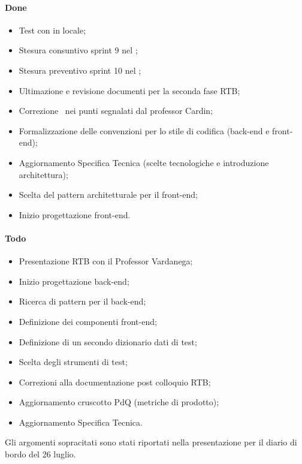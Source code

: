 \paragraph{Done}
\begin{itemize}
	\item Test con  in locale;
	\item Stesura consuntivo sprint 9 nel \PdP;
	\item Stesura preventivo sprint 10 nel \PdP;
	\item Ultimazione e revisione documenti per la seconda fase RTB;
	\item Correzione \AdR\ nei punti segnalati dal professor Cardin;
	\item Formalizzazione delle convenzioni per lo stile di codifica (back-end e front-end);
	\item Aggiornamento Specifica Tecnica (scelte tecnologiche e introduzione architettura);
	\item Scelta del pattern architetturale per il front-end;
	\item Inizio progettazione front-end.
\end{itemize}

\paragraph{Todo}
\begin{itemize}
	\item Presentazione RTB con il Professor Vardanega;
	\item Inizio progettazione back-end;
	\item Ricerca di pattern per il back-end;
	\item Definizione dei componenti front-end;
	\item Definizione di un secondo dizionario dati di test;
	\item Scelta degli strumenti di test;
	\item Correzioni alla documentazione post colloquio RTB;
	\item Aggiornamento cruscotto PdQ (metriche di prodotto);
	\item Aggiornamento Specifica Tecnica.
\end{itemize}

\vspace{0.5\baselineskip}
\par Gli argomenti sopracitati sono stati riportati nella presentazione per il diario di bordo del 26 luglio.